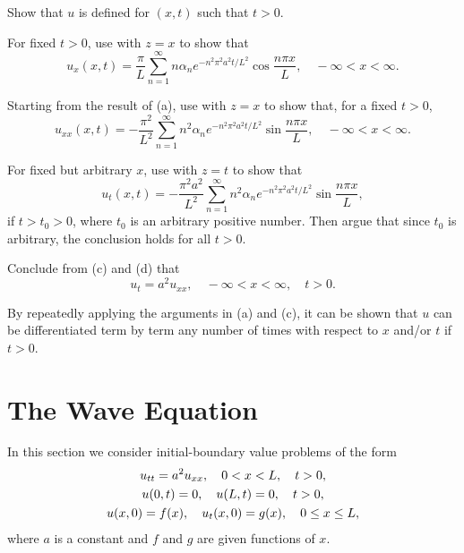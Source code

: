 \begin{exerciselist}
\begin{alist}
\item %
Show that $u$ is defined for $(x,t)$ such that $t>0$.
\item %
For fixed $t>0$,
use  with $z=x$
 to show that
\[
u_x(x,t)=\frac{\pi}{L}\sum_{n=1}^\infty n\alpha_n e^{-n^2\pi^2
a^2t/L^2}\cos\frac{n\pi x}{L},\quad -\infty<x<\infty.
\]
\item %
Starting from the result of (a),
use  with $z=x$
 to show that, for a fixed $t>0$,
\[
u_{xx}(x,t)=-\frac{\pi^2}{L^2}\sum_{n=1}^\infty n^2\alpha_n
e^{-n^2\pi^2 a^2t/L^2}\sin\frac{n\pi x}{L},\quad-\infty<x<\infty.
\]
\item %
For fixed but arbitrary $x$,
use  with $z=t$
 to show that
\[
u_t(x,t)=-\frac{\pi^2a^2}{L^2}\sum_{n=1}^\infty n^2\alpha_n
e^{-n^2\pi^2 a^2t/L^2}\sin\frac{n\pi x}{L},
\]
if $t>t_0>0$, where $t_0$ is an arbitrary positive number.
 Then argue that since $t_0$ is arbitrary,
the conclusion holds for all $t>0$.
\item %
Conclude from (c) and (d) that
\[
u_t=a^2u_{xx},\quad -\infty<x<\infty,\quad t>0.
\]
\end{alist}

By repeatedly applying the arguments in (a) and (c),
it can be shown that $u$ can be differentiated term by term any
number of times with respect to $x$ and/or $t$ if $t>0$.

\end{exerciselist}


\section{The Wave Equation}\label{sec:wave_eq}

In this section we consider initial-boundary value problems of the
form
\begin{gather}
u_{tt}=a^2u_{xx},\quad 0<x<L,\quad t>0,\notag\\
u(0,t)=0,\quad u(L,t)=0,\quad t>0,\label{eq:12.2.1}\\
u(x,0)=f(x),\quad u_t(x,0)=g(x), \quad 0\le x\le L,\notag
\end{gather}
where $a$ is a constant and $f$ and $g$  are given functions of $x$.

